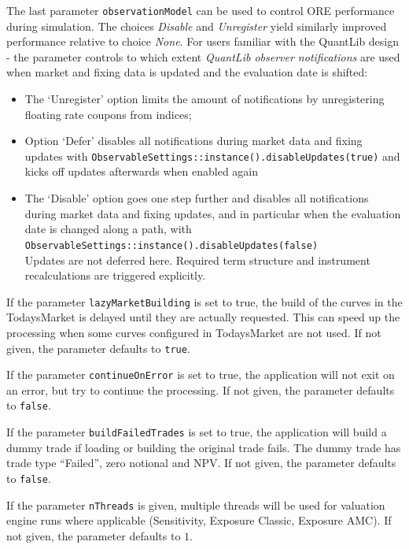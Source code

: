 \medskip The last parameter {\tt observationModel} can be used to control ORE performance during simulation. The choices
{\em Disable } and {\em Unregister } yield similarly improved performance relative to choice {\em None}. For users
familiar with the QuantLib design - the parameter controls to which extent {\em QuantLib observer notifications} are
used when market and fixing data is updated and the evaluation date is shifted:
\begin{itemize}
\item The `Unregister' option limits the amount of notifications by unregistering floating rate coupons from indices;
\item Option `Defer' disables all notifications during market data and fixing updates with
{\tt ObservableSettings::instance().disableUpdates(true)}
and kicks off updates afterwards when enabled again
\item The `Disable' option goes one step further and disables all notifications during market data and fixing updates,
  and in particular when the evaluation date is changed along a path, with \\
  {\tt ObservableSettings::instance().disableUpdates(false)} \\
  Updates are not deferred here. Required term structure and instrument recalculations are triggered explicitly.
\end{itemize}

\medskip If the parameter {\tt lazyMarketBuilding} is set to true, the build of the curves in the TodaysMarket is
delayed until they are actually requested. This can speed up the processing when some curves configured in TodaysMarket
are not used. If not given, the parameter defaults to {\tt true}.

\medskip If the parameter {\tt continueOnError} is set to true, the application will not exit on an error, but try to
continue the processing. If not given, the parameter defaults to {\tt false}.

\medskip If the parameter {\tt buildFailedTrades} is set to true, the application will build a dummy trade if loading or
building the original trade fails. The dummy trade has trade type ``Failed'', zero notional and NPV.
If not given, the parameter defaults to {\tt false}.

\medskip If the parameter {\tt nThreads} is given, multiple threads will be used for valuation engine runs where
applicable (Sensitivity, Exposure Classic, Exposure AMC). If not given, the parameter defaults to $1$.

